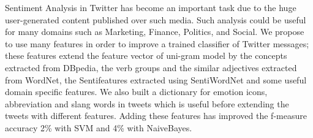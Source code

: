 Sentiment Analysis in Twitter has become an important task due to the huge user-generated
 content published over such media. Such
 analysis could be useful for many domains
 such as Marketing, Finance, Politics, and Social.
 We propose to use many features in order
 to improve a trained classifier of Twitter messages;
 these features extend the feature vector
 of uni-gram model by the concepts extracted
 from DBpedia, the verb groups and the similar
 adjectives extracted from WordNet, the Sentifeatures
 extracted using SentiWordNet and
 some useful domain specific features. We also
 built a dictionary for emotion icons, abbreviation
 and slang words in tweets which is useful
 before extending the tweets with different features.
 Adding these features has improved the
 f-measure accuracy 2\% with SVM and 4\%
 with NaiveBayes.


